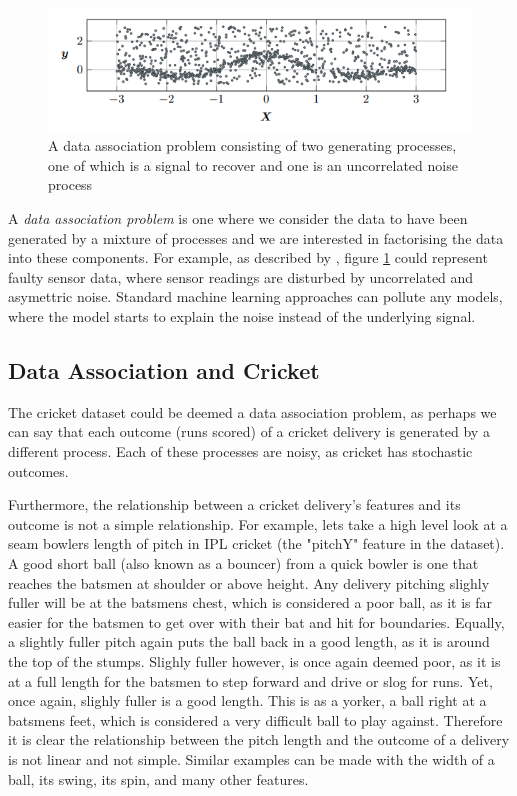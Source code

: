 \documentclass[12pt,a4paper]{report}
\theoremstyle{definition}
\begin{document}
\begin{figure}[H]
    \centering
    \includegraphics[width=\linewidth]{data_association_problem.png}
    \caption{A data association problem consisting of two generating processes, one of which is a signal to recover and one is an uncorrelated noise process \citep{Kaiser2018}}
    \label{fig:DataAssocProblem}
\end{figure}

A \emph{data association problem} is one where we consider the data to have been generated by a mixture of processes and we are interested in factorising the data into these components. 
For example, as described by \citet{Kaiser2018}, figure \ref{fig:DataAssocProblem} could represent faulty sensor data, where sensor readings are disturbed by uncorrelated and asymettric noise. 
Standard machine learning approaches can pollute any models, where the model starts to explain the noise instead of the underlying signal. 

\subsection{Data Association and Cricket}

The cricket dataset could be deemed a data association problem, as perhaps we can say that each outcome (runs scored) of a cricket delivery is generated by a different process. 
Each of these processes are noisy, as cricket has stochastic outcomes. 

Furthermore, the relationship between a cricket delivery's features and its outcome is not a simple relationship. 
For example, lets take a high level look at a seam bowlers length of pitch in IPL cricket (the "pitchY" feature in the dataset).
A good short ball (also known as a bouncer) from a quick bowler is one that reaches the batsmen at shoulder or above height. 
Any delivery pitching slighly fuller will be at the batsmens chest, which is considered a poor ball, as it is far easier for the batsmen to get over with their bat and hit for boundaries.
Equally, a slightly fuller pitch again puts the ball back in a good length, as it is around the top of the stumps. 
Slighly fuller however, is once again deemed poor, as it is at a full length for the batsmen to step forward and drive or slog for runs. 
Yet, once again, slighly fuller is a good length.
This is as a yorker, a ball right at a batsmens feet, which is considered a very difficult ball to play against. 
Therefore it is clear the relationship between the pitch length and the outcome of a delivery is not linear and not simple.
Similar examples can be made with the width of a ball, its swing, its spin, and many other features.
\end{document}
